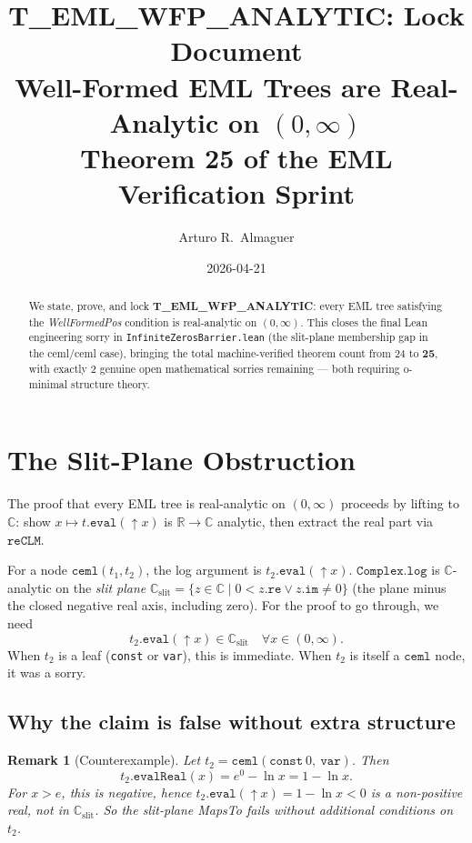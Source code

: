 \documentclass[12pt]{article}
\title{\textbf{T\_EML\_WFP\_ANALYTIC: Lock Document}\\[0.4em]
\large Well-Formed EML Trees are Real-Analytic on $(0,\infty)$\\
\normalsize Theorem 25 of the EML Verification Sprint}
\author{Arturo R.\ Almaguer}
\date{2026-04-21}
\newtheorem{remark}[theorem]{Remark}
\begin{document}
\maketitle

\begin{abstract}
We state, prove, and lock \textbf{T\_EML\_WFP\_ANALYTIC}: every EML tree satisfying the
\emph{WellFormedPos} condition is real-analytic on $(0,\infty)$.
This closes the final Lean engineering sorry in \texttt{InfiniteZerosBarrier.lean} (the
slit-plane membership gap in the ceml/ceml case), bringing the total machine-verified
theorem count from 24 to \textbf{25}, with exactly 2 genuine open mathematical sorries
remaining --- both requiring o-minimal structure theory.
\end{abstract}

\section{The Slit-Plane Obstruction}

The proof that every EML tree is real-analytic on $(0,\infty)$ proceeds by lifting
to $\mathbb{C}$: show $x \mapsto t.\mathtt{eval}(\uparrow\!x)$ is $\mathbb{R} \to \mathbb{C}$
analytic, then extract the real part via $\mathtt{reCLM}$.

For a node $\mathtt{ceml}(t_1, t_2)$, the log argument is $t_2.\mathtt{eval}(\uparrow\!x)$.
$\mathtt{Complex.log}$ is $\mathbb{C}$-analytic on the \emph{slit plane}
$\mathbb{C}_{\mathrm{slit}} = \{z \in \mathbb{C} \mid 0 < z.\mathtt{re} \lor z.\mathtt{im} \neq 0\}$
(the plane minus the closed negative real axis, including zero).
For the proof to go through, we need
\[
  t_2.\mathtt{eval}(\uparrow\!x) \in \mathbb{C}_{\mathrm{slit}}
  \quad \forall x \in (0,\infty).
\]
When $t_2$ is a leaf (\texttt{const} or \texttt{var}), this is immediate.
When $t_2$ is itself a $\mathtt{ceml}$ node, it was a sorry.

\subsection{Why the claim is false without extra structure}

\begin{remark}[Counterexample]
Let $t_2 = \mathtt{ceml}(\mathtt{const}\ 0,\ \mathtt{var})$. Then
\[
  t_2.\mathtt{evalReal}(x) = e^0 - \ln x = 1 - \ln x.
\]
For $x > e$, this is negative, hence $t_2.\mathtt{eval}(\uparrow\!x) = 1 - \ln x < 0$
is a non-positive real, \emph{not} in $\mathbb{C}_{\mathrm{slit}}$.
So the slit-plane MapsTo fails without additional conditions on $t_2$.
\end{remark}
\end{document}
